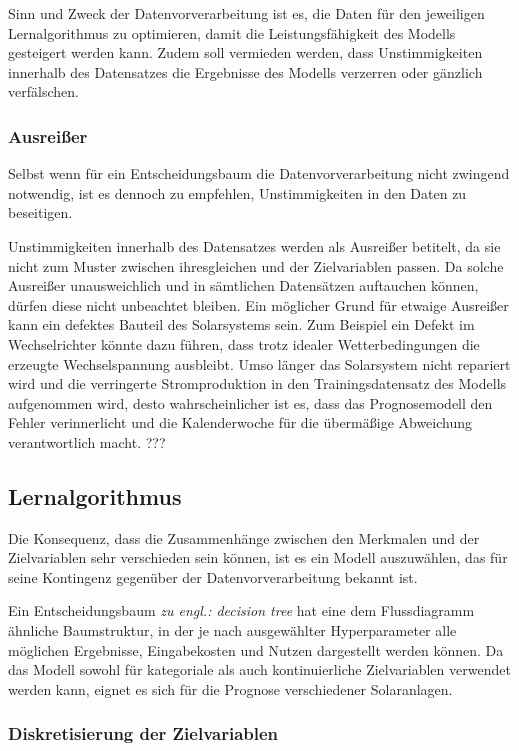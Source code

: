 \documentclass[12pt, a4paper]{article}
\begin{document}
Sinn und Zweck der Datenvorverarbeitung ist es, die Daten für den jeweiligen Lernalgorithmus zu optimieren, damit die Leistungsfähigkeit des Modells gesteigert werden kann. Zudem soll vermieden werden, dass Unstimmigkeiten innerhalb des Datensatzes die Ergebnisse des Modells verzerren oder gänzlich verfälschen.

\subsubsection{Ausreißer}
\label{subsubsec:outlier}

Selbst wenn für ein Entscheidungsbaum die Datenvorverarbeitung nicht zwingend notwendig, ist es dennoch zu empfehlen, Unstimmigkeiten in den Daten zu beseitigen.

Unstimmigkeiten innerhalb des Datensatzes werden als Ausreißer betitelt, da sie nicht zum Muster zwischen ihresgleichen und der Zielvariablen passen. Da solche Ausreißer unausweichlich und in sämtlichen Datensätzen auftauchen können, dürfen diese nicht unbeachtet bleiben. Ein möglicher Grund für etwaige Ausreißer kann ein defektes Bauteil des Solarsystems sein. Zum Beispiel ein Defekt im Wechselrichter könnte dazu führen, dass trotz idealer Wetterbedingungen die erzeugte Wechselspannung ausbleibt. Umso länger das Solarsystem nicht repariert wird und die verringerte Stromproduktion in den Trainingsdatensatz des Modells aufgenommen wird, desto wahrscheinlicher ist es, dass das Prognosemodell den Fehler verinnerlicht und die Kalenderwoche für die übermäßige Abweichung verantwortlich macht.
???
\subsection{Lernalgorithmus}

Die Konsequenz, dass die Zusammenhänge zwischen den Merkmalen und der Zielvariablen sehr verschieden sein können, ist es ein Modell auszuwählen, das für seine Kontingenz gegenüber der Datenvorverarbeitung bekannt ist. 

Ein Entscheidungsbaum \textit{zu engl.: decision tree} hat eine dem Flussdiagramm ähnliche Baumstruktur, in der je nach ausgewählter Hyperparameter alle möglichen Ergebnisse, Eingabekosten und Nutzen dargestellt werden können. Da das Modell sowohl für kategoriale als auch kontinuierliche Zielvariablen verwendet werden kann, eignet es sich für die Prognose verschiedener Solaranlagen. 

\subsubsection{Diskretisierung der Zielvariablen}
\end{document}
